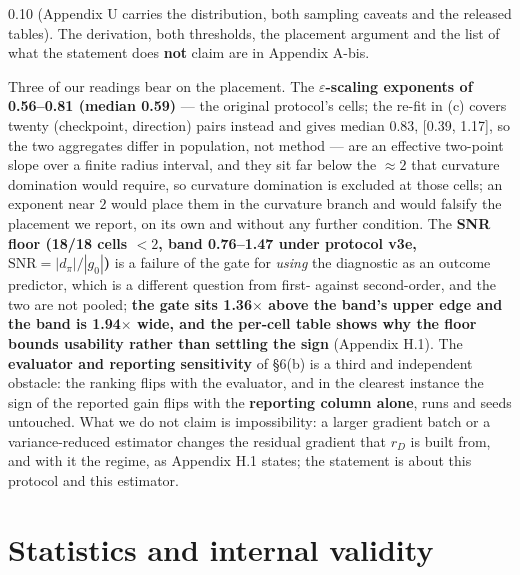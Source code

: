 \documentclass[pdflatex,sn-mathphys-ay]{sn-jnl}
\begin{document}
0.10 (Appendix U carries the distribution, both sampling caveats and the released tables). The derivation, both thresholds, the placement argument and the list of what the statement does \textbf{not} claim are in Appendix A-bis.

Three of our readings bear on the placement. The \textbf{\ensuremath{\varepsilon}-scaling exponents of 0.56--0.81 (median 0.59)} --- the original protocol's cells; the re-fit in (c) covers twenty (checkpoint, direction) pairs instead and gives median 0.83, [0.39, 1.17], so the two aggregates differ in population, not method --- are an effective two-point slope over a finite radius interval, and they sit far below the $\approx2$ that curvature domination would require, so curvature domination is excluded at those cells; an exponent near $2$ would place them in the curvature branch and would falsify the placement we report, on its own and without any further condition. The \textbf{SNR floor (18/18 cells $<2$, band 0.76--1.47 under protocol v3e, $\mathrm{SNR}=|d_\pi|/|g_0|$)} is a failure of the gate for \emph{using} the diagnostic as an outcome predictor, which is a different question from first- against second-order, and the two are not pooled; \textbf{the gate sits 1.36\ensuremath{\times} above the band's upper edge and the band is 1.94\ensuremath{\times} wide, and the per-cell table shows why the floor bounds usability rather than settling the sign} (Appendix H.1). The \textbf{evaluator and reporting sensitivity} of \S{}6(b) is a third and independent obstacle: the ranking flips with the evaluator, and in the clearest instance the sign of the reported gain flips with the \textbf{reporting column alone}, runs and seeds untouched. What we do not claim is impossibility: a larger gradient batch or a variance-reduced estimator changes the residual gradient that $r_D$ is built from, and with it the regime, as Appendix H.1 states; the statement is about this protocol and this estimator.

\section{Statistics and internal validity}%
\end{document}
